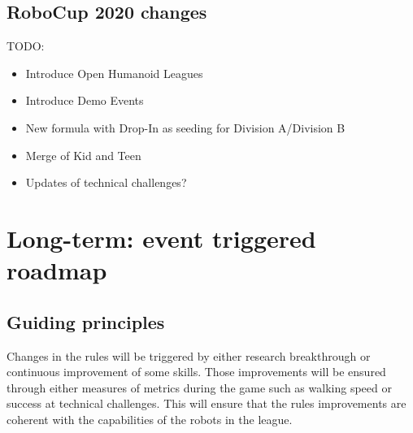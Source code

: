 \documentclass{article}
\begin{document}
\subsection{RoboCup 2020 changes}

TODO: 
\begin{itemize}
\item Introduce Open Humanoid Leagues
\item Introduce Demo Events
\item New formula with Drop-In as seeding for Division A/Division B
\item Merge of Kid and Teen
\item Updates of technical challenges?
\end{itemize}


\section{\label{sec:LongTerm}Long-term: event triggered roadmap}



\subsection{Guiding principles}

Changes in the rules will be triggered by either research breakthrough or
continuous improvement of some skills. Those improvements will be ensured
through either measures of metrics during the game such as walking speed or
success at technical challenges. This will ensure that the rules improvements
are coherent with the capabilities of the robots in the league.
\end{document}
